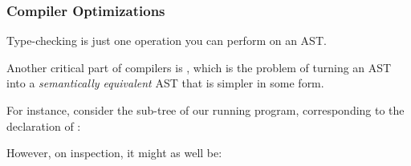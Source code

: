 \documentclass[aspectratio=169]{beamer}
\begin{document}
\begin{frame}[fragile]
  \frametitle{Compiler Optimizations}

  \ptmt

  Type-checking is just one operation you can perform on an AST.

  \pause
  \vspace{\fill}

  Another critical part of compilers is ,
  which is the problem of turning an AST into a \textit{semantically equivalent}
  AST that is simpler in some form.

  \pause
  \vspace{\fill}

  \begin{center}
  \begin{minipage}[t]{0.45\textwidth}
    \raggedright

    For instance, consider the sub-tree of our running program, corresponding
    to the declaration of :
    \begin{center}
    \end{center}
  \end{minipage}
  \hspace{10pt}
  \begin{minipage}[t]{0.45\textwidth}
    \raggedright

    However, on inspection, it might as well be:

    \begin{center}
    \end{center}
  \end{minipage}
  \end{center}
\end{frame}
\end{document}
